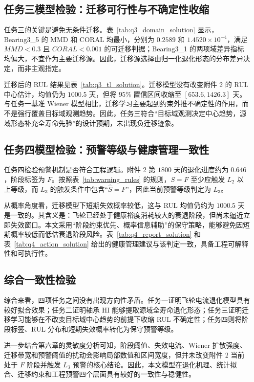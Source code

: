 \subsection{任务三模型检验：迁移可行性与不确定性收缩}

任务三的关键是避免无条件迁移。表~\ref{tab:q3_domain_solution} 显示，Bearing3\_5 的 MMD 和 CORAL 均最小，分别为 $0.2589$ 和 $1.4520\times10^{-4}$，满足 $MMD<0.3$ 且 $CORAL<0.001$ 的可迁移判据；Bearing3\_1 的两项域差异指标均偏大，不宜作为主要迁移源。因此，迁移源选择由归一化退化形态的分布差异决定，而非主观指定。

迁移后的 RUL 结果见表~\ref{tab:q3_tl_solution}。迁移模型没有改变附件 2 的 RUL 中心估计，均值仍为 $1000.5$ 天，但将 $95\%$ 置信区间收缩至 $[653.6,1426.3]$ 天。与任务一基准 Wiener 模型相比，迁移学习主要起到约束外推不确定性的作用，而不是强行覆盖目标域观测趋势。因此，任务三符合“目标域观测决定中心趋势，源域形态补充全寿命先验”的设计预期，未出现负迁移迹象。

\subsection{任务四模型检验：预警等级与健康管理一致性}

任务四检验预警机制是否符合工程逻辑。附件 2 第 $1800$ 天的退化进度约为 $0.646$，阶段标签为 $F$。按照表~\ref{tab:warning_rules} 的规则，$S=F$ 至少应触发 $L_2$ 以上等级，而 $L_3$ 的触发条件中包含“$\hat S=F$”，因此当前预警等级判定为 $L_3$。

从概率角度看，迁移模型下短期失效概率较低，这与 RUL 均值仍约为 $1000.5$ 天是一致的。其含义是：飞轮已经处于健康裕度消耗较大的衰退阶段，但尚未逼近立即失效窗口。本文采用“阶段约束优先、概率信息辅助”的保守策略，能够避免因短期概率较低而低估衰退阶段风险。表~\ref{tab:q4_report_solution} 和表~\ref{tab:q4_action_solution} 给出的健康管理建议与该判定一致，具备工程可解释性和可执行性。

\subsection{综合一致性检验}

综合来看，四项任务之间没有出现方向性矛盾。任务一证明飞轮电流退化模型具有较好拟合效果；任务二证明轴承 HI 能够提取源域全寿命退化形态；任务三证明迁移学习能够在不改变目标域中心趋势的前提下收缩 RUL 不确定性；任务四则将阶段标签、RUL 分布和短期失效概率转化为保守预警等级。

进一步结合第六章的灵敏度分析可知，阶段阈值、失效电流、Wiener 扩散强度、迁移带宽和预警阈值的扰动会影响局部数值和区间宽度，但并未改变附件 2 当前处于 $F$ 阶段并触发 $L_3$ 预警的核心结论。因此，本文模型在退化机理、统计拟合、迁移约束和工程预警四个层面具有较好的一致性与稳健性。
